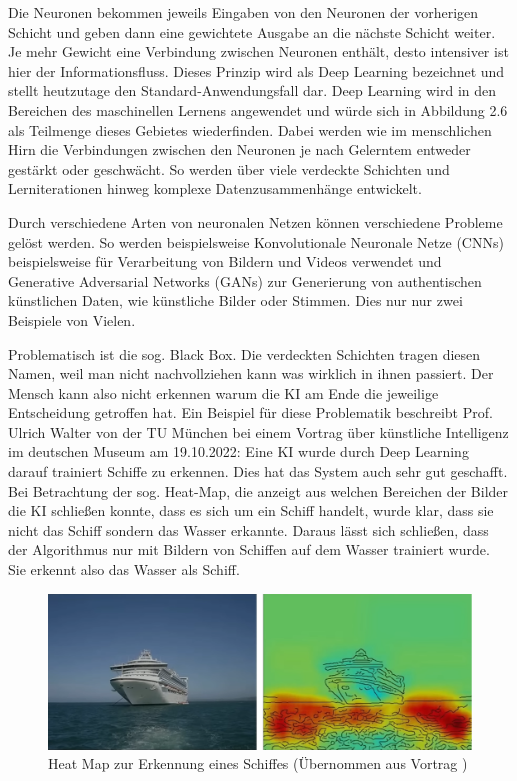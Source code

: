 \documentclass[a4paper,12pt, german]{report}
\begin{document}
Die Neuronen bekommen jeweils Eingaben von den Neuronen der vorherigen Schicht und geben dann eine gewichtete Ausgabe an die nächste Schicht weiter. Je mehr Gewicht eine Verbindung zwischen Neuronen enthält, desto intensiver ist hier der Informationsfluss. Dieses Prinzip wird als Deep Learning bezeichnet und stellt heutzutage den Standard-Anwendungsfall dar. Deep Learning wird in den Bereichen des maschinellen Lernens angewendet und würde sich in Abbildung 2.6 als Teilmenge dieses Gebietes wiederfinden. Dabei werden wie im menschlichen Hirn die Verbindungen zwischen den Neuronen je nach Gelerntem entweder gestärkt oder geschwächt. So werden über viele verdeckte Schichten und Lerniterationen hinweg komplexe Datenzusammenhänge entwickelt.\cite{17}


Durch verschiedene Arten von neuronalen Netzen können verschiedene Probleme gelöst werden. So werden beispielsweise Konvolutionale Neuronale Netze (CNNs) beispielsweise für Verarbeitung von Bildern und Videos verwendet und Generative Adversarial Networks (GANs) zur Generierung von authentischen künstlichen Daten, wie künstliche Bilder oder Stimmen. Dies nur nur zwei Beispiele von Vielen.

Problematisch ist die sog. Black Box. Die verdeckten Schichten tragen diesen Namen, weil man nicht nachvollziehen kann was wirklich in ihnen passiert. Der Mensch kann also nicht erkennen warum die KI am Ende die jeweilige Entscheidung getroffen hat. Ein Beispiel für diese Problematik beschreibt Prof. Ulrich Walter von der TU München bei einem Vortrag über künstliche Intelligenz im deutschen Museum am 19.10.2022: Eine KI wurde durch Deep Learning darauf trainiert Schiffe zu erkennen. Dies hat das System auch sehr gut geschafft. Bei Betrachtung der sog. Heat-Map, die anzeigt aus welchen Bereichen der Bilder die KI schließen konnte, dass es sich um ein Schiff handelt, wurde klar, dass sie nicht das Schiff sondern das Wasser erkannte. Daraus lässt sich schließen, dass der Algorithmus nur mit Bildern von Schiffen auf dem Wasser trainiert wurde. Sie erkennt also das Wasser als Schiff. \cite{16}

\begin{figure}[H]
  \center
 \includegraphics[width=14cm]{images/Schiff-HeatMap.png}
  \caption[Heat Map zur Erkennung eines Schiffes]{Heat Map zur Erkennung eines Schiffes (Übernommen aus Vortrag \cite{16})}
\end{figure}
\end{document}
